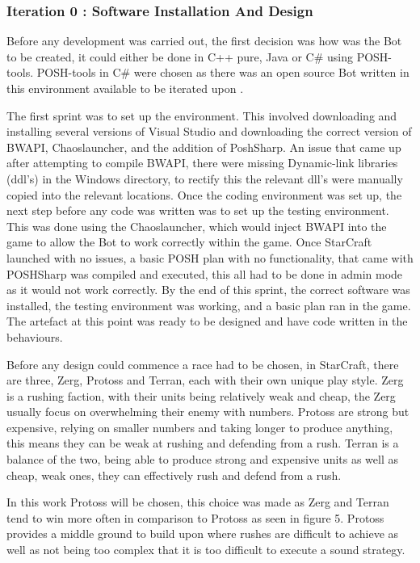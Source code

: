 \documentclass[journal]{IEEEtran}
\begin{document}
	\subsubsection{Iteration 0 : Software Installation And Design}
	Before any development was carried out, the first decision was how was the Bot to be created, it could either be done in C++ pure, Java or C\# using POSH-tools. POSH-tools in C\# were chosen as there was an open source Bot written in this environment available to be iterated upon \cite{Swen}.
	
	The first sprint was to set up the environment. This involved downloading and installing several versions of Visual Studio and downloading the correct version of BWAPI, Chaoslauncher, and the addition of PoshSharp. An issue that came up after attempting to compile BWAPI, there were missing Dynamic-link libraries (ddl's) in the Windows directory, to rectify this the relevant dll's were manually copied into the relevant locations. Once the coding environment was set up, the next step before any code was written was to set up the testing environment. This was done using the Chaoslauncher, which would inject BWAPI into the game to allow the Bot to work correctly within the game. Once StarCraft launched with no issues, a basic POSH plan with no functionality, that came with POSHSharp was compiled and executed, this all had to be done in admin mode as it would not work correctly. By the end of this sprint, the correct software was installed, the testing environment was working, and a basic plan ran in the game. The artefact at this point was ready to be designed and have code written in the behaviours.
	
	Before any design could commence a race had to be chosen, in StarCraft, there are three, Zerg, Protoss and Terran, each with their own unique play style. Zerg is a rushing faction, with their units being relatively weak and cheap, the Zerg usually focus on overwhelming their enemy with numbers. Protoss are strong but expensive, relying on smaller numbers and taking longer to produce anything, this means they can be weak at rushing and defending from a rush. Terran is a balance of the two, being able to produce strong and expensive units as well as cheap, weak ones, they can effectively rush and defend from a rush.
	
	In this work Protoss will be chosen, this choice was made as Zerg and Terran tend to win more often in comparison to Protoss as seen in figure 5. Protoss provides a middle ground to build upon where rushes are difficult to achieve as well as not being too complex that it is too difficult to execute a sound strategy. 
		
\end{document}
